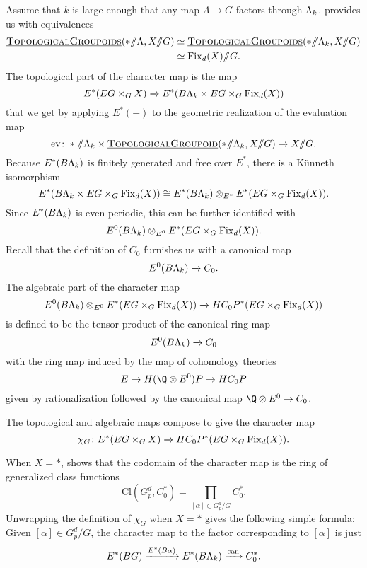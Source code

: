 Assume that $k$ is large enough that any map $\Lambda \rightarrow G$ factors through $\Lambda_k$.   provides us with equivalences
\begin{align*}
\InternalHom{TopologicalGroupoids}(* \mmod \Lambda, X \mmod G) & \simeq \InternalHom{TopologicalGroupoids}(* \mmod \Lk, X \mmod G) \\
& \simeq \Fix_d(X)\mmod G.
\end{align*}
The topological part of the character map is the map
\[
E^*(EG \times_G X) \xrightarrow{} E^*(B\Lambda_k \times EG\times_G \operatorname{Fix}_d(X))
\]
that we get by applying $E^*(-)$ to the geometric realization of the evaluation map
\[
\mathrm{ev} \colon * \mmod \Lk \times \InternalHom{TopologicalGroupoid}(* \mmod \Lk, X \mmod G) \xrightarrow{} X \mmod G.
\]
Because $E^*(B\Lambda_k)$ is finitely generated and free over $E^*$, there is a K\"unneth isomorphism
\[
E^*(B\Lambda_k \times EG\times_G \operatorname{Fix}_d(X)) \cong E^*(B\Lambda_k) \otimes_{E^*} E^*(EG \times_G \operatorname{Fix}_d(X)).
\]
Since $E^*(B\Lambda_k)$ is even periodic, this can be further identified with
\[
E^0(B\Lambda_k) \otimes_{E^0} E^*(EG \times_G \operatorname{Fix}_d(X)).
\]
Recall that the definition of $C_0$ furnishes us with a canonical map
\[
E^0(B\Lambda_k) \xrightarrow{} C_0.
\]
The algebraic part of the character map
\[
E^0(B\Lambda_k) \otimes_{E^0} E^*(EG \times_G \operatorname{Fix}_d(X)) \xrightarrow{} HC_{0}P^{*}(EG \times_G \operatorname{Fix}_d(X)) 
\]
is defined to be the tensor product of the canonical ring map
\[
E^0(B\Lambda_k) \xrightarrow{} C_0
\]
with the ring map induced by the map of cohomology theories
\[
E \rightarrow H(\Q \otimes E^0)P \rightarrow HC_0P
\]
given by rationalization followed by the canonical map $\Q \otimes E^0 \rightarrow C_0$.

The topological and algebraic maps compose to give the character map
\[
\chi_G \colon E^*(EG \times_G X) \xrightarrow{} HC_{0}P^{*}(EG \times_G \operatorname{Fix}_d(X)).
\]


\begin{example} \label{app:charmapexample}
When $X = \ast$,  shows that the codomain of the character map is the ring of generalized class functions 
\[
\mathrm{Cl}(G_{p}^{d}, C_{0}^{*}) = \prod_{[\alpha] \in G_{p}^{d}/G} C_{0}^*. 
\]
Unwrapping the definition of $\chi_G$ when $X = \ast$ gives the following simple formula: Given $[\alpha] \in G_{p}^{d}/G$, the character map to the factor corresponding to $[\alpha]$ is just
\[
E^*(BG) \xrightarrow{E^*(B\alpha)} E^*(B\Lambda_k) \xrightarrow{\text{can}} C_{0}^{*}.
\]
\end{example}


